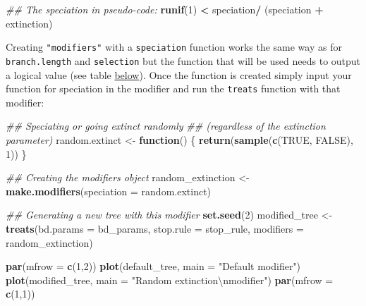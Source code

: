\documentclass[
]{book}
\newenvironment{Shaded}{\begin{snugshade}}{\end{snugshade}}
\newcommand{\CharTok}[1]{\textcolor[rgb]{0.31,0.60,0.02}{#1}}
\newcommand{\CommentTok}[1]{\textcolor[rgb]{0.56,0.35,0.01}{\textit{#1}}}
\newcommand{\ControlFlowTok}[1]{\textcolor[rgb]{0.13,0.29,0.53}{\textbf{#1}}}
\newcommand{\DataTypeTok}[1]{\textcolor[rgb]{0.13,0.29,0.53}{#1}}
\newcommand{\DecValTok}[1]{\textcolor[rgb]{0.00,0.00,0.81}{#1}}
\newcommand{\KeywordTok}[1]{\textcolor[rgb]{0.13,0.29,0.53}{\textbf{#1}}}
\newcommand{\NormalTok}[1]{#1}
\newcommand{\OperatorTok}[1]{\textcolor[rgb]{0.81,0.36,0.00}{\textbf{#1}}}
\newcommand{\OtherTok}[1]{\textcolor[rgb]{0.56,0.35,0.01}{#1}}
\newcommand{\StringTok}[1]{\textcolor[rgb]{0.31,0.60,0.02}{#1}}
\begin{document}
\begin{Shaded}
\begin{Highlighting}[]
\CommentTok{\#\# The speciation in pseudo{-}code:}
\KeywordTok{runif}\NormalTok{(}\DecValTok{1}\NormalTok{) }\OperatorTok{\textless{}}\StringTok{ }\NormalTok{speciation}\OperatorTok{/}\StringTok{ }\NormalTok{(speciation }\OperatorTok{+}\StringTok{ }\NormalTok{extinction)}
\end{Highlighting}
\end{Shaded}

Creating \texttt{"modifiers"} with a \texttt{speciation} function works the same way as for \texttt{branch.length} and \texttt{selection} but the function that will be used needs to output a logical value (see table \protect\hyperlink{summarymodifiers}{below}).
Once the function is created simply input your function for speciation in the modifier and run the \texttt{treats} function with that modifier:

\begin{Shaded}
\begin{Highlighting}[]
\CommentTok{\#\# Speciating or going extinct randomly}
\CommentTok{\#\# (regardless of the extinction parameter)}
\NormalTok{random.extinct  \textless{}{-}}\StringTok{ }\ControlFlowTok{function}\NormalTok{() \{}
    \KeywordTok{return}\NormalTok{(}\KeywordTok{sample}\NormalTok{(}\KeywordTok{c}\NormalTok{(}\OtherTok{TRUE}\NormalTok{, }\OtherTok{FALSE}\NormalTok{), }\DecValTok{1}\NormalTok{))}
\NormalTok{\}}

\CommentTok{\#\# Creating the modifiers object}
\NormalTok{random\_extinction \textless{}{-}}\StringTok{ }\KeywordTok{make.modifiers}\NormalTok{(}\DataTypeTok{speciation =}\NormalTok{ random.extinct)}

\CommentTok{\#\# Generating a new tree with this modifier}
\KeywordTok{set.seed}\NormalTok{(}\DecValTok{2}\NormalTok{)}
\NormalTok{modified\_tree \textless{}{-}}\StringTok{ }\KeywordTok{treats}\NormalTok{(}\DataTypeTok{bd.params =}\NormalTok{ bd\_params,}
                        \DataTypeTok{stop.rule =}\NormalTok{ stop\_rule,}
                        \DataTypeTok{modifiers =}\NormalTok{ random\_extinction)}

\KeywordTok{par}\NormalTok{(}\DataTypeTok{mfrow =} \KeywordTok{c}\NormalTok{(}\DecValTok{1}\NormalTok{,}\DecValTok{2}\NormalTok{))}
\KeywordTok{plot}\NormalTok{(default\_tree,  }\DataTypeTok{main =} \StringTok{"Default modifier"}\NormalTok{)}
\KeywordTok{plot}\NormalTok{(modified\_tree, }\DataTypeTok{main =} \StringTok{"Random extinction}\CharTok{\textbackslash{}n}\StringTok{modifier"}\NormalTok{)}
\KeywordTok{par}\NormalTok{(}\DataTypeTok{mfrow =} \KeywordTok{c}\NormalTok{(}\DecValTok{1}\NormalTok{,}\DecValTok{1}\NormalTok{))}
\end{Highlighting}
\end{Shaded}
\end{document}
